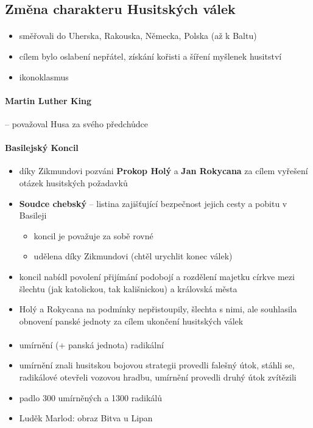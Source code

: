\subsection{Změna charakteru Husitských válek}
\paragraph{}
\begin{itemize}
\item směřovali do Uherska, Rakouska, Německa, Polska (až k Baltu)
\item cílem bylo oslabení nepřátel, získání kořisti a šíření myšlenek husitství
\item ikonoklasmus
\end{itemize}

\paragraph{Martin Luther King} -- považoval Husa za svého předchůdce

\paragraph{Basilejský Koncil}
\begin{itemize}
\item díky Zikmundovi pozváni \textbf{Prokop Holý} a \textbf{Jan Rokycana} za cílem vyřešení otázek husitských požadavků
\item \textbf{Soudce chebský} -- listina zajišťující bezpečnost jejich cesty a pobitu v Basileji
\begin{itemize}
\item koncil je považuje za sobě rovné
\item udělena díky Zikmundovi (chtěl urychlit konec válek)
\end{itemize}
\item koncil nabídl povolení přijímání podobojí a rozdělení majetku církve mezi šlechtu (jak katolickou, tak kališnickou) a královská města 
\item Holý a Rokycana na podmínky nepřistoupily, šlechta s nimi, ale souhlasila \ra obnovení panské jednoty za cílem ukončení husitských válek
\end{itemize}

\paragraph{}
\begin{itemize}
\item umírnění (+ panská jednota) \x radikální
\item umírnění znali husitskou bojovou strategii \ra provedli falešný útok, stáhli se, radikálové otevřeli vozovou hradbu, umírnění provedli druhý útok \ra zvítězili
\item padlo 300 umírněných a 1300 radikálů
\item Luděk Marlod: obraz Bitva u Lipan
\end{itemize}

